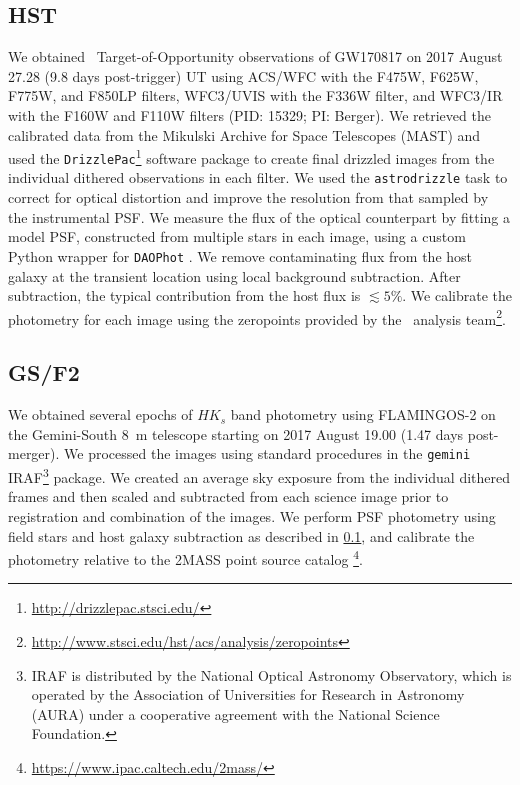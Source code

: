 \subsection{HST}
\label{sec:ch5_data_HST}
We obtained \HST\ Target-of-Opportunity observations of GW170817 on 2017 August 27.28 (9.8 days post-trigger) UT using ACS/WFC with the F475W, F625W, F775W, and F850LP filters, WFC3/UVIS with the F336W filter, and WFC3/IR with the F160W and F110W filters (PID: 15329; PI: Berger).  We retrieved the calibrated data from the Mikulski Archive for Space Telescopes (MAST) and used the {\tt DrizzlePac}\footnote{\url{http://drizzlepac.stsci.edu/}} software package to create final drizzled images from the individual dithered observations in each filter.  We used the {\tt astrodrizzle} task to correct for optical distortion and improve the resolution from that sampled by the instrumental PSF. We measure the flux of the optical counterpart by fitting a model PSF, constructed from multiple stars in each image, using a custom Python wrapper for {\tt DAOPhot} \citep{Stetson1987}. We remove contaminating flux from the host galaxy at the transient location using local background subtraction. After subtraction, the typical contribution from the host flux is $\lesssim5\%$. We calibrate the photometry for each image using the zeropoints provided by the \HST\ analysis team\footnote{\url{http://www.stsci.edu/hst/acs/analysis/zeropoints}}.

\subsection{GS/F2}
\label{sec:ch5_data_GSF2}
We obtained several epochs of $HK_s$ band photometry using FLAMINGOS-2 on the Gemini-South 8~m telescope \citep{Eikenberry+12} starting on 2017 August 19.00 (1.47 days post-merger). We processed the images using standard procedures in the {\tt gemini} IRAF\footnote{IRAF is distributed by the National Optical Astronomy Observatory, which is operated by the Association of Universities for Research in Astronomy (AURA) under a cooperative agreement with the National Science Foundation.} package.  We created an average sky exposure from the individual dithered frames and then scaled and subtracted from each science image prior to registration and combination of the images. We perform PSF photometry using field stars and host galaxy subtraction as described in \cref{sec:ch5_data_HST}, and calibrate the photometry relative to the 2MASS point source catalog \footnote{\url{https://www.ipac.caltech.edu/2mass/}}.

